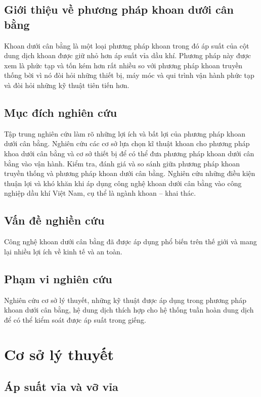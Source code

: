 \documentclass[12pt,a4paper]{article}
\begin{document}
\subsection{Giới thiệu về phương pháp khoan dưới cân bằng}
Khoan dưới cân bằng là một loại phương pháp khoan trong đó áp suất của cột dung dịch khoan được giữ nhỏ hơn áp suất vỉa dầu khí.
Phương pháp này được xem là phức tạp và tốn kém hơn rất nhiều so với phương pháp khoan truyền thống bời vì nó đòi hỏi những thiết bị, máy móc và qui trình vận hành phức tạp và đòi hỏi những kỹ thuật tiên tiến hơn.
\subsection{Mục đích nghiên cứu}
Tập trung nghiên cứu làm rõ những lợi ích và bất lợi của phương pháp khoan dưới cân bằng. Nghiên cứu các cơ sở lựa chọn kĩ thuật khoan cho phương pháp khoa dưới cân bằng và cơ sở thiết bị để có thể đưa phương pháp khoan dưới cân bằng vào vận hành. Kiểm tra, đánh giá và so sánh giữa phương pháp khoan truyền thống và phương pháp khoan dưới cân bằng. Nghiên cứu những điều kiện thuận lợi và khó khăn khi áp dụng công nghệ khoan dưới cân bằng vào công nghiệp dầu khí Việt Nam, cụ thể là ngành khoan – khai thác.

\subsection{Vấn đề nghiền cứu}
Công nghệ khoan dưới cân bằng đã được áp dụng phổ biến trên thế giới và mang lại nhiều lợi ích về kinh tế và an toàn.

\subsection{Phạm vi nghiên cứu}
Nghiên cứu cơ sở lý thuyết, những kỹ thuật được áp dụng trong phương pháp khoan dưới cân bằng, hệ dung dịch thích hợp cho hệ thống tuần hoàn dung dịch để có thể kiểm soát được áp suất trong giếng.


\section{Cơ sở lý thuyết}
\subsection{Áp suất vỉa và vỡ vỉa}
\end{document}
